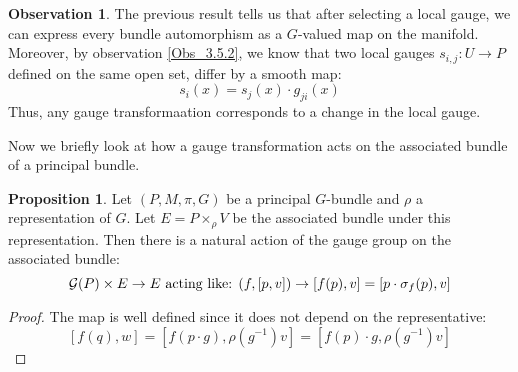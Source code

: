 \documentclass[12pt,a4paper]{report}
\theoremstyle{definition}
\theoremstyle{Theorem}
\newtheorem{Prop}[Def]{Proposition}
\theoremstyle{definition}
\theoremstyle{definition}
\newtheorem{Obs}[Def]{Observation}
\begin{document}
	\begin{Obs}
		The previous result tells us that after selecting a local gauge, we can express every bundle automorphism as a $G$-valued map on the manifold. Moreover, by observation \ref{Obs_3.5.2}, we know that two local gauges $s_{i,j}:U\rightarrow P$ defined on the same open set, differ by a smooth map: $$s_i(x)=s_j(x)\cdot g_{ji}(x)$$
		Thus, any gauge transformaation corresponds to a change in the local gauge.
	\end{Obs}
	Now we briefly look at how a gauge transformation acts on the associated bundle of a principal bundle.
	\begin{Prop}\label{Prop_7.1.3}
		Let $(P,M,\pi,G)$ be a principal $G$-bundle and $\rho$ a representation of $G$. Let $E=P\times_\rho V$ be the associated bundle under this representation. Then there is a natural action of the gauge group on the associated bundle:
		$$\mathcal{G}(P)\times E\rightarrow E\hbox{ acting like: }(f,[p,v])\rightarrow [f(p),v]=[p\cdot \sigma_f(p),v]$$
	\end{Prop}
	\begin{proof}
		The map is well defined since it does not depend on the representative:
		$$[f(q),w]=[f(p\cdot g),\rho(g^{-1})v]=[f(p)\cdot g,\rho(g^{-1})v]$$
	\end{proof}
\end{document}
